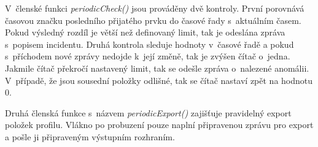 \begin{itemize}
 V~členské funkci \textit{periodicCheck()} jsou prováděny dvě kontroly. První porovnává
 časovou značku posledního přijatého prvku do časové řady s~aktuálním časem. Pokud výsledný rozdíl je větší
 než definovaný limit, tak je odeslána zpráva s~popisem incidentu. Druhá kontrola sleduje hodnoty
 v~časové řadě a pokud s~příchodem nové zprávy nedojde k~její změně, tak je zvýšen čítač o~jedna. 
 Jakmile čítač překročí nastavený limit, tak se odešle zpráva o~nalezené anomálii. V~případě,
 že jsou sousední položky odlišné, tak se čítač nastaví zpět na hodnotu 0.
 
 Druhá členská funkce s~názvem \textit{periodicExport()} zajišťuje pravidelný export položek profilu.
 Vlákno po probuzení pouze naplní připravenou zprávu pro export a pošle ji připraveným výstupním
 rozhraním.
 
\end{itemize}


